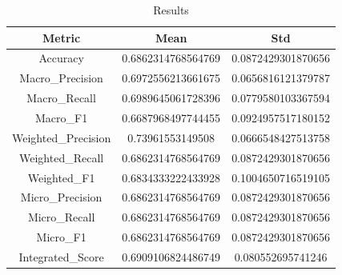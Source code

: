 \begin{table}[htbp]
\centering
\caption{Results}
\label{tab:csv}
\small
\setlength{\tabcolsep}{4pt}
\begin{tabular}{|c|c|c|}
\hline
Metric & Mean & Std \\
\hline
Accuracy & 0.6862314768564769 & 0.0872429301870656 \\
Macro_Precision & 0.6972556213661675 & 0.0656816121379787 \\
Macro_Recall & 0.6989645061728396 & 0.0779580103367594 \\
Macro_F1 & 0.6687968497744455 & 0.0924957517180152 \\
Weighted_Precision & 0.73961553149508 & 0.0666548427513758 \\
Weighted_Recall & 0.6862314768564769 & 0.0872429301870656 \\
Weighted_F1 & 0.6834333222433928 & 0.1004650716519105 \\
Micro_Precision & 0.6862314768564769 & 0.0872429301870656 \\
Micro_Recall & 0.6862314768564769 & 0.0872429301870656 \\
Micro_F1 & 0.6862314768564769 & 0.0872429301870656 \\
Integrated_Score & 0.6909106824486749 & 0.080552695741246 \\
\hline
\end{tabular}
\end{table}
